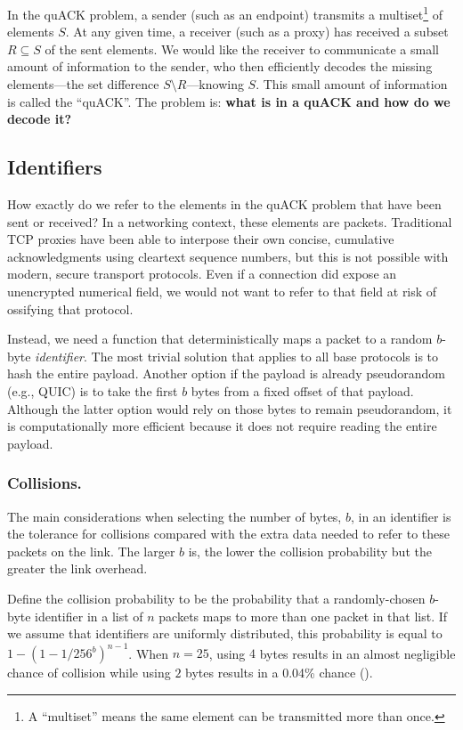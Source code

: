In the quACK problem, a sender (such as an endpoint) transmits a
multiset\footnote{A ``multiset'' means the same element can be transmitted more
than once.} of elements $S$. At any given time, a receiver (such as a proxy)
has received a subset $R \subseteq S$ of the sent elements. We would like the
receiver to communicate a small amount of information to the sender, who then
efficiently decodes the missing elements---the set difference $S \setminus
R$---knowing $S$. This small amount of information is called the ``quACK''. The
problem is: \textbf{what is in a quACK and how do we decode it?}

\subsection{Identifiers}
\label{sec:quack:problem:identifiers}

How exactly do we refer to the elements in the quACK problem that have been sent
or received? In a networking context, these elements are packets. Traditional
TCP proxies have been able to interpose their own concise, cumulative
acknowledgments using cleartext sequence numbers, but this is not possible with
modern, secure transport protocols. Even if a connection did expose an
unencrypted numerical field, we would not want to refer to that field at risk
of ossifying that protocol.

Instead, we need a function that deterministically maps
a packet to a random $b$-byte \emph{identifier}. The most trivial solution
that applies to all base protocols is
to hash the entire payload. Another option if the payload is already
pseudorandom (e.g., QUIC) is to take the first $b$ bytes from a fixed
offset of that payload. Although the latter option would rely on those bytes
to remain pseudorandom, it is computationally more efficient because it
does not require reading the entire payload.

\subsubsection{Collisions.}
The main considerations when selecting the number of bytes, $b$, in an
identifier is the tolerance for collisions compared with the extra data
needed to refer to these packets on the link. The larger $b$ is, the lower
the collision probability but the greater the link overhead.

Define the collision probability to be the probability that a randomly-chosen
$b$-byte identifier in a list of $n$ packets maps to more than one packet in
that list.
If we assume that identifiers are uniformly distributed,
this probability is equal to $1-(1 - 1/256^{b})^{n-1}$.
When $n=25$,  using $4$ bytes results in an almost negligible chance of
collision while using $2$ bytes results in a 0.04\% chance
().


